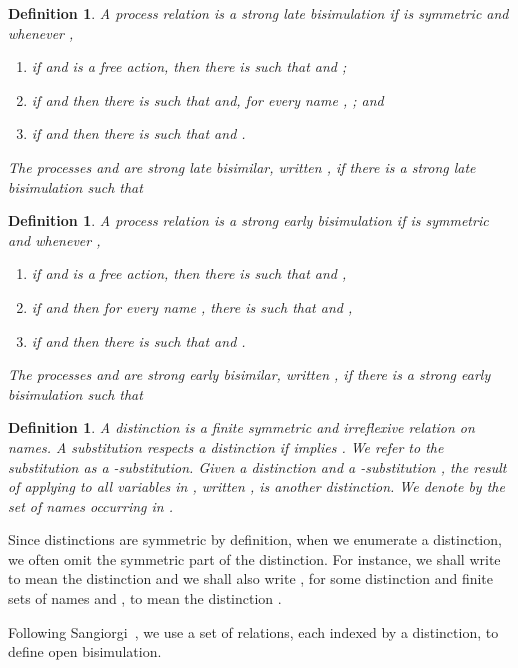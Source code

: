 \documentclass{acmtrans2m}
\newenvironment{definition}{\begin{define} \rm}{\end{define}}
\newtheorem{define}[theorem]{Definition}
\begin{document}
\begin{definition} 
\label{def:lbisim}
A process relation  is a {\em strong late bisimulation}
if  is symmetric and whenever ,
\begin{enumerate}
\item if  and  is a free action,
  then there is  such that
   and ;
\item if  and  
  then there is  such that
   and, for every name , 
  ; and 
\item if  and  
  then there is 
  such that  and .
\end{enumerate}
The processes  and  are {\em strong late bisimilar},
written , if there is a strong late bisimulation
 such that 
\end{definition}

\begin{definition} 
\label{def:ebisim}
A process relation  is a {\em strong early bisimulation}
if  is symmetric and whenever ,
\begin{enumerate}
\item if  and  is a free action,
  then there is  such that
   and ,
\item if  and  
  then for every name , there is  such that
   and ,
\item if  and  
  then there is 
  such that  and .
\end{enumerate}
The processes  and  are {\em strong early bisimilar}, written 
, if there is a strong early bisimulation  such that

\end{definition}

\begin{definition} 
A {\em distinction}  is a finite symmetric and irreflexive relation
on names.  A substitution  {\em respects} a distinction  if
 implies . We refer to the
substitution  as a {\em -substitution}.  Given a distinction
 and a -substitution , the result of applying 
to all variables in , written , is another distinction.
We denote by  the set of names occurring in .
\end{definition}

Since distinctions are symmetric by definition, when we enumerate a
distinction, we often omit the symmetric part of the distinction.  For
instance, we shall write  to mean the distinction  and we shall also write , for some
distinction  and finite sets of names  and , to mean the
distinction .
 
Following Sangiorgi~\cite{sangiorgi96acta}, we use a set of relations,
each indexed by a distinction, to define open bisimulation.
\end{document}
